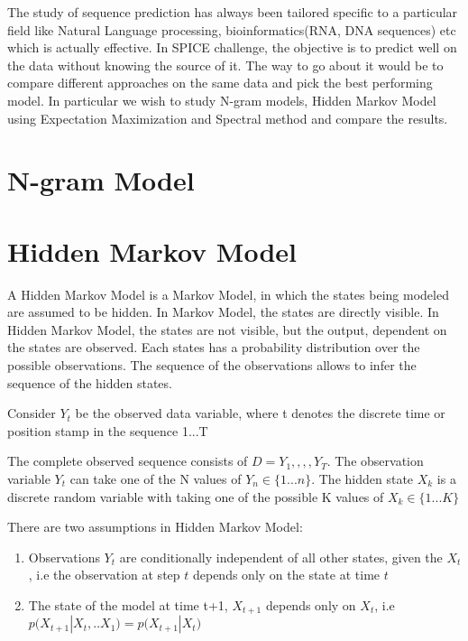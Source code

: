 \documentclass{article} %
\begin{document}
The study of sequence prediction has always been tailored specific to a particular field like Natural Language processing, bioinformatics(RNA, DNA sequences) etc which is actually effective. In SPICE challenge, the objective is to predict well on the data without knowing the source of it. The way to go about it would be to compare different approaches on the same data and pick the best performing model. In particular we wish to study N-gram models, Hidden Markov Model using Expectation Maximization and Spectral method and compare the results.

\section{N-gram Model}
\label{N-Gram Model}

\section{Hidden Markov Model}
\label{HMM}

A Hidden Markov Model is a Markov Model, in which the states being modeled are assumed to be hidden. In Markov Model, the states are directly visible. In Hidden Markov Model, the states are not visible, but the output, dependent on the states are observed. Each states has a probability distribution over the possible observations. The sequence of the observations allows to infer the sequence of the hidden states. 

Consider \(Y_t\) be the observed data variable, where t denotes the discrete time or position stamp in the sequence 1...T

The complete observed sequence consists of \(D ={Y_1,,,,Y_T}\). The observation variable $Y_t$ can take one of the N values of \(Y_n \in \{1...n\}\). The hidden state \(X_k\) is a discrete random variable with taking one of the possible K values of \(X_k \in \{1...K\}\)

There are two assumptions in Hidden Markov Model:
\begin{enumerate}
\item Observations $Y_t$ are conditionally independent of all other states, given the \(X_t\), i.e the observation at step \(t\) depends only on the state at time \(t\)
\item The state of the model at time t+1, \(X_{t+1}\) depends only on \(X_t\), i.e 
\( p\big(X_{t+1}|X_t,..X_1\big) = p\big(X_{t+1}|X_t\big) \)
\end{enumerate}
\end{document}
